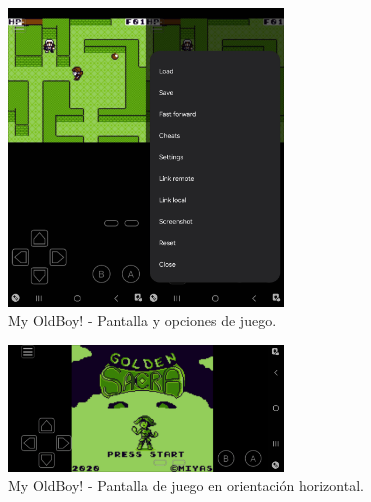 \begin{figure}[h]
    \centering
    \includegraphics[width=0.65\textwidth]{include/images/myoldboy3.jpg}
    \caption{My OldBoy! - Pantalla y opciones de juego.}
    \label{figure:oldboy3}
\end{figure}
\begin{figure}[H]
    \centering
    \includegraphics[width=0.65\textwidth]{include/images/myoldboyportrait.jpg}
    \caption{My OldBoy! - Pantalla de juego en orientación horizontal.}
    \label{figure:oldboy4}
\end{figure}

\clearpage

